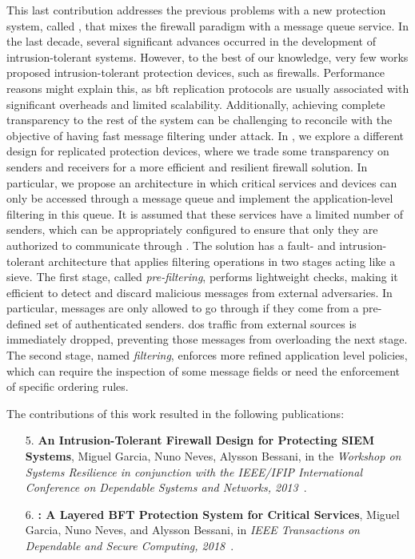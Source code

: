 This last contribution addresses the previous problems with a new protection system, called \sieveq, that mixes the firewall paradigm with a message queue service.
In the last decade, several significant advances occurred in the development of intrusion-tolerant systems.
However, to the best of our knowledge, very few works proposed intrusion-tolerant protection devices, such as firewalls.
Performance reasons might explain this, as \gls{bft} replication protocols are usually associated with significant overheads and limited scalability.
Additionally, achieving complete transparency to the rest of the system can be challenging to reconcile with the objective of having fast message filtering under attack.
In \sieveq, we explore a different design for replicated protection devices, where we trade some transparency on senders and receivers for a more efficient and resilient firewall solution.
In particular, we propose an architecture in which critical services and devices can only be accessed through a message queue and implement the application-level filtering in this queue.
It is assumed that these services have a limited number of senders, which can be appropriately configured to ensure that only they are authorized to communicate through \sieveq.
The solution has a fault- and intrusion-tolerant architecture that applies filtering operations in two stages acting like a sieve.
The first stage, called \emph{pre-filtering}, performs lightweight checks, making it efficient to detect and discard malicious messages from external adversaries.
In particular, messages are only allowed to go through if they come from a pre-defined set of authenticated senders.
\gls{dos} traffic from external sources is immediately dropped, preventing those messages from overloading the next stage.
The second stage, named \emph{filtering}, enforces more refined application level policies, which can require the inspection of some message fields or need the enforcement of specific ordering rules.

The contributions of this work resulted in the following publications:

\begin{enumerate}
\item[5.] \textbf{An Intrusion-Tolerant Firewall Design for Protecting SIEM Systems}, Miguel Garcia, Nuno Neves, Alysson Bessani, in the \emph{Workshop on Systems Resilience in conjunction with the IEEE/IFIP International Conference on Dependable Systems and Networks, 2013}~\cite{Garcia:2013}.

\item[6.] \textbf{\sieveq: A Layered BFT Protection System for Critical Services}, Miguel Garcia, Nuno Neves, and Alysson Bessani, in \emph{IEEE Transactions on Dependable and Secure Computing, 2018}~\cite{Garcia:2016}.
\end{enumerate}



